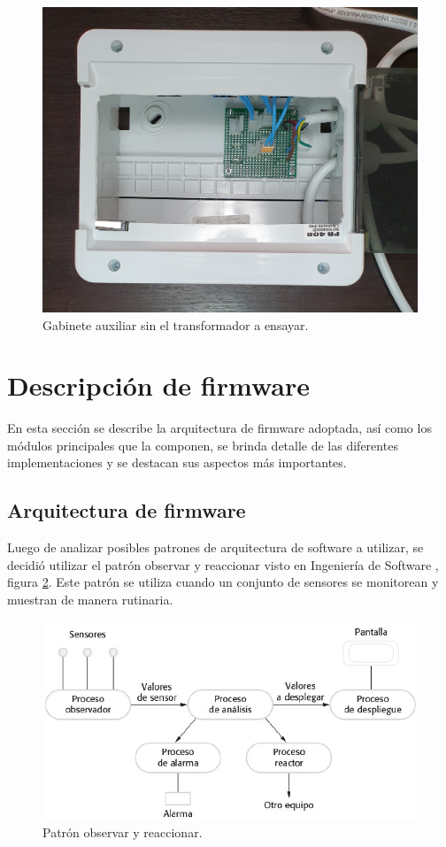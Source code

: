 \begin{figure}[hb]
	\centering
	\includegraphics[scale=0.065, angle=270]{./Figures/gab4.jpg}
	\caption{Gabinete auxiliar sin el transformador a ensayar.}
	\label{fig:gab4}
\end{figure}


\section{Descripción de firmware}

En esta sección se describe la arquitectura de firmware adoptada, así como los módulos principales que la componen, se brinda detalle de las diferentes implementaciones y se destacan sus aspectos más importantes.

\subsection{Arquitectura de firmware}
Luego de analizar posibles patrones de arquitectura de software a utilizar, se decidió utilizar el patrón observar y reaccionar visto en Ingeniería de Software \citep{INGSOFT}, figura \ref{fig:patron}. Este patrón se utiliza cuando un conjunto de sensores se monitorean y muestran de manera rutinaria.

\begin{figure}[htpb]
	\centering
	\includegraphics[scale=0.55]{./Figures/patron.png}
	\caption{Patrón observar y reaccionar.}
	\label{fig:patron}
\end{figure}

